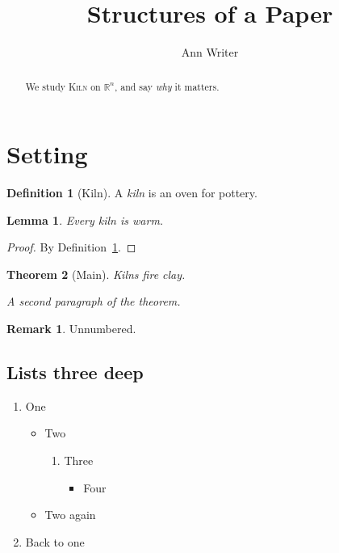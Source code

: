 \documentclass{article}
\title{Structures %
of a Paper}
\author{Ann Writer}
\date{}
\newtheorem{theorem}{Theorem}[section]
\newtheorem{lemma}[theorem]{Lemma}
\theoremstyle{definition}
\newtheorem{definition}{Definition}
\newtheorem*{remark}{Remark}
\newcommand{\R}{\mathbb{R}}
\newcommand{\tool}{\textsc{Kiln}}
\newcommand{\note}[1]{\textit{#1}}
\begin{document}
\maketitle
\begin{abstract}
We study \tool{} on $\R^n$, %
and say \note{why} it matters.
\end{abstract}

\section{Setting}\label{sec:setting}

\begin{definition}[Kiln]\label{def:kiln}
A \emph{kiln} is an oven %
for pottery.
\end{definition}

\begin{lemma}
Every kiln is warm.
\end{lemma}
\begin{proof}
By Definition~\ref{def:kiln}. %
\end{proof}

\begin{theorem}[Main]\label{thm:main}
Kilns fire clay.

A second paragraph of the theorem.
\end{theorem}

\begin{remark}
Unnumbered.
\end{remark}

\subsection{Lists three deep}

\begin{enumerate}
  \item One
  \begin{itemize}
    \item Two %
    \begin{enumerate}
      \item Three
      \begin{itemize}
        \item Four
      \end{itemize}
    \end{enumerate}
    \item Two again
  \end{itemize}
  \item Back to one
\end{enumerate}
\end{document}

